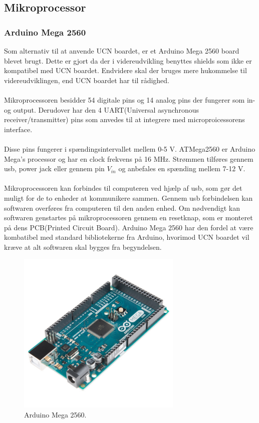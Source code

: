 \subsection{Mikroprocessor}
\subsubsection{Arduino Mega 2560}
Som alternativ til at anvende UCN boardet, er et Arduino Mega 2560 board blevet brugt. Dette er gjort da der i videreudvikling benyttes shields som ikke er kompatibel med UCN boardet. Endvidere skal der bruges mere hukommelse til videreudviklingen, end UCN boardet har til rådighed.
\\
\\
Mikroprocessoren besidder 54 digitale pins og 14 analog pins der fungerer som in- og output. Derudover har den 4 UART(Universal asynchronous receiver/transmitter) pins som anvedes til at integrere med microproicessorens interface.
\\
\\
Disse pins fungerer i spændingsintervallet mellem 0-5 V. ATMega2560 er Arduino Mega's processor og har en clock frekvens på 16 MHz. Strømmen tilføres gennem usb, power jack eller gennem pin $V_{in}$ og anbefales en spænding mellem 7-12 V. 
\\
\\
Mikroprocessoren kan forbindes til computeren ved hjælp af usb, som gør det muligt for de to enheder at kommunikere sammen. Gennem usb forbindelsen kan softwaren overføres fra computeren til den anden enhed. Om nødvendigt kan softwaren genstartes på mikroprocessoren gennem en resetknap, som er monteret på dens PCB(Printed Circuit Board).
\newline 
Arduino Mega 2560 har den fordel at være kombatibel med standard bibliotekerne fra Arduino, hvorimod UCN boardet vil kræve at alt softwaren skal bygges fra begyndelsen.

\begin{figure}[h!]
  \centering
  \includegraphics[width=0.7\textwidth]{figures/arduinoMega.jpg}
  \caption{Arduino Mega 2560.}
  \label{arduino2569}
\end{figure} 

\newpage



